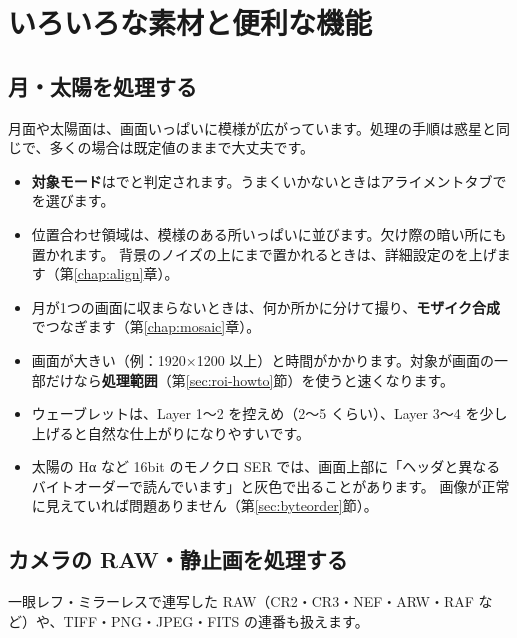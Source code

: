 \chapter{いろいろな素材と便利な機能}\label{chap:sources}

\section{月・太陽を処理する}\label{sec:moon}

月面や太陽面は、画面いっぱいに模様が広がっています。処理の手順は惑星と同じで、多くの場合は既定値のままで大丈夫です。


\begin{itemize}[itemsep=2pt]
  \item \textbf{対象モード}はでと判定されます。うまくいかないときはアライメントタブでを選びます。
  \item 位置合わせ領域は、模様のある所いっぱいに並びます。欠け際の暗い所にも置かれます。
        背景のノイズの上にまで置かれるときは、詳細設定のを上げます（第\ref{chap:align}章）。
  \item 月が1つの画面に収まらないときは、何か所かに分けて撮り、\textbf{モザイク合成}でつなぎます（第\ref{chap:mosaic}章）。
  \item 画面が大きい（例：1920×1200 以上）と時間がかかります。対象が画面の一部だけなら\textbf{処理範囲}（第\ref{sec:roi-howto}節）を使うと速くなります。
  \item ウェーブレットは、Layer 1〜2 を控えめ（2〜5 くらい）、Layer 3〜4 を少し上げると自然な仕上がりになりやすいです。
  \item 太陽の Hα など 16bit のモノクロ SER では、画面上部に「ヘッダと異なるバイトオーダーで読んでいます」と灰色で出ることがあります。
        画像が正常に見えていれば問題ありません（第\ref{sec:byteorder}節）。
\end{itemize}

\section{カメラの RAW・静止画を処理する}\label{sec:raw}

一眼レフ・ミラーレスで連写した RAW（CR2・CR3・NEF・ARW・RAF など）や、TIFF・PNG・JPEG・FITS の連番も扱えます。

